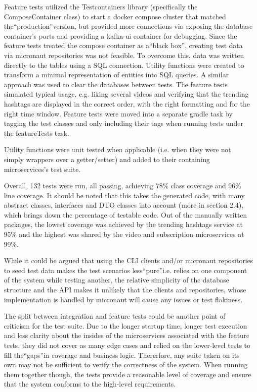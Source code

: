 \documentclass[parskip=full]{article}
\begin{document}
Feature tests utilized the Testcontainers library (specifically the ComposeContainer class) to start a docker compose cluster that matched the``production''version, but provided more connections via exposing the database container's ports and providing a kafka-ui container for debugging.
Since the feature tests treated the compose container as a``black box'', creating test data via micronaut repositories was not feasible.
To overcome this, data was written directly to the tables using a SQL connection.
Utility functions were created to transform a minimal representation of entities into SQL queries.
A similar approach was used to clear the databases between tests.
The feature tests simulated typical usage, e.g. liking several videos and verifying that the trending hashtags are displayed in the correct order, with the right formatting and for the right time window.
Feature tests were moved into a separate gradle task by tagging the test classes and only including their tags when running tests under the featureTests task.

Utility functions were unit tested when applicable (i.e. when they were not simply wrappers over a getter/setter) and added to their containing microservices's test suite.

Overall, 132 tests were run, all passing, achieving 78\% class coverage and 96\% line coverage.
It should be noted that this takes the generated code, with many abstract classes, interfaces and DTO classes into account (more in section 2.4), which brings down the percentage of testable code.
Out of the manually written packages, the lowest coverage was achieved by the trending hashtags service at 95\% and the highest was shared by the video and subscription microservices at 99\%.

While it could be argued that using the CLI clients and/or micronaut repositories to seed test data makes the test scenarios less``pure''i.e. relies on one component of the system while testing another, the relative simplicity of the database structure and the API makes it unlikely that the clients and repositories, whose implementation is handled by micronaut will cause any issues or test flakiness.

The split between integration and feature tests could be another point of criticism for the test suite.
Due to the longer startup time, longer test execution and less clarity about the insides of the microservices associated with the feature tests, they did not cover as many edge cases and relied on the lower-level tests to fill the``gaps''in coverage and business logic.
Thererfore, any suite taken on its own may not be sufficient to verify the correctness of the system.
When running them together though, the tests provide a reasonable level of coverage and ensure that the system conforms to the high-level requirements.
\end{document}
